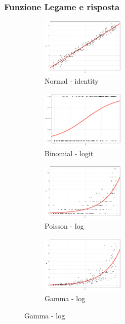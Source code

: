 \documentclass[pdf, aspectratio=169]{beamer}\usepackage[]{graphicx}\usepackage[]{color}
\theoremstyle{definition}
\begin{document}
\begin{frame}
\frametitle{Funzione Legame e risposta}

\fontsize{9pt}{11pt}\selectfont

\begin{figure}
  \centering
  \begin{subfigure}[b]{4.8cm}
    \centering
    \includegraphics[width=4cm]{_bookdown_files/_main_files/figure-latex/resp-var-1.pdf}
    \caption{Normal - identity}
  \end{subfigure}
  \qquad
  \begin{subfigure}[b]{4.8cm}
    \centering
    \includegraphics[width=4cm]{_bookdown_files/_main_files/figure-latex/resp-var-2.pdf}
    \caption{Binomial - logit}
  \end{subfigure}
  \par\medskip
  \begin{subfigure}[b]{4.8cm}
    \centering
    \includegraphics[width=4cm]{_bookdown_files/_main_files/figure-latex/resp-var-3.pdf}
    \caption{Poisson - log}
  \end{subfigure}
  \qquad
  \begin{subfigure}[b]{4.8cm}
    \centering
    \includegraphics[width=4cm]{_bookdown_files/_main_files/figure-latex/resp-var-4.pdf}
    \caption{Gamma - log}
  \end{subfigure}
\end{figure}

\end{frame}
\end{document}
